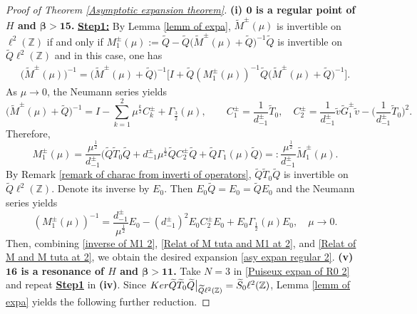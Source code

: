 \documentclass[10pt,a4paper]{amsart}
\newcommand\Z{\mathbb{Z}}
\numberwithin{equation}{section}
\begin{document}
\begin{proof}[Proof of Theorem {\rm\ref{Asymptotic expansion theorem}}]{\bf{(i) ${\bm{0}}$ is a regular point of $H$ and {$\bm{\beta>15}$}.}}
{\bf{\underline{Step1:}}} By Lemma \ref{lemm of expa}, $\widetilde{M}^{\pm}(\mu)$ is invertible on $\ell^{2}(\Z)$ if and only if $ M^{\pm}_1(\mu):=\widetilde{Q}-\widetilde{Q}\big(\widetilde{M}^{\pm}(\mu)+\widetilde{Q}\big)^{-1}\widetilde{Q}$ is invertible on $\widetilde{Q}\ell^{2}(\Z)$ and in this case, one has
\begin{align}\label{Relat of M tuta and M1 at 2}
\big(\widetilde{M}^{\pm}(\mu)\big)^{-1}=\big(\widetilde{M}^{\pm}(\mu)+\widetilde{Q}\big)^{-1}\Big[I+\widetilde{Q}\left(M^{\pm}_1(\mu)\right)^{-1}\widetilde{Q}\big(\widetilde{M}^{\pm}(\mu)+\widetilde{Q}\big)^{-1}\Big].
\end{align}
As $\mu\rightarrow0$, the Neumann series yields
\begin{equation}\label{expr of Ckpm}
\big(\widetilde{M}^{\pm}(\mu)+\widetilde{Q}\big)^{-1}=I-\sum\limits_{k=1}^{2}\mu^{\frac{k}{2}}C^{\pm}_{k}+\Gamma_{\frac{3}{2}}(\mu),\qquad C^{\pm}_{1}=\frac{1}{d^{\pm}_{-1}}\widetilde{T}_0,\quad C^{\pm}_{2}=\frac{1}{d^{\pm}_{-1}}\tilde{v}\widetilde{G}^{\pm}_1\tilde{v}-\Big(\frac{1}{d^{\pm}_{-1}}\widetilde{T}_0\Big)^2.
\end{equation}
Therefore,
\begin{equation}\label{Relat of M1 and M1 tuta at 2}
M^{\pm}_1(\mu)=\frac{\mu^{\frac{1}{2}}}{d^{\pm}_{-1}}\Big(\widetilde{Q}\widetilde{T}_0\widetilde{Q}+d^{\pm}_{-1}\mu^{\frac{1}{2}}\widetilde{Q}C^{\pm}_{2}\widetilde{Q}+\widetilde{Q}\Gamma_{1}(\mu)\widetilde{Q}\Big)=:\frac{\mu^{\frac{1}{2}}}{d^{\pm}_{-1}}\widetilde{M}^{\pm}_1(\mu).
\end{equation}
By Remark \ref{remark of charac from inverti of operators}, $\widetilde{Q}\widetilde{T}_0\widetilde{Q}$ is invertible on $\widetilde{Q}\ell^{2}(\Z)$. Denote its inverse by $E_0$. Then  $E_0\widetilde{Q}=E_0=\widetilde{Q}E_0$ and the Neumann series yields
\begin{equation}\label{inverse of M1 2}
\left( M^{\pm}_1(\mu)\right)^{-1}=\frac{d^{\pm}_{-1}}{\mu^{\frac{1}{2}}}E_0-\left(d^{\pm}_{-1}\right)^2E_0C^{\pm}_2E_0+E_0\Gamma_{\frac{1}{2}}(\mu)E_0,\quad\mu\rightarrow0.
\end{equation}
Then, combining \eqref{inverse of M1 2}, \eqref{Relat of M tuta and M1 at 2}, and \eqref{Relat of M and M tuta at 2}, we obtain the desired expansion \eqref{asy expan regular 2}.
\vskip0.1cm
{\bf{(v) ${\bm{16}}$ is a resonance of $H$ and {$\bm{\beta>11}$}.}} Take $N=3$ in \eqref{Puiseux expan of R0 2} and repeat {\bf{\underline{Step1}}} in {\bf{(iv)}}. Since ${\rm Ker}\widetilde{Q}\widetilde{T}_0\widetilde{Q}\big|_{\widetilde{Q}\ell^2(\Z)}=\widetilde{S}_0\ell^2(\Z)$, Lemma \ref{lemm of expa} yields the following further reduction.

\end{proof}
\end{document}

